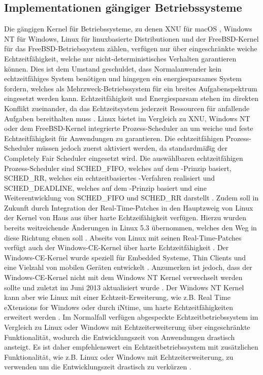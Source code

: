 \subsection{Implementationen gängiger Betriebssysteme} %
Die gängigen Kernel für Betriebssysteme, zu denen XNU für macOS \cite{xnu_2019}, Windows NT für Windows, Linux für linuxbasierte Distributionen und der FreeBSD-Kernel für das FreeBSD-Betriebssystem zählen, verfügen nur über eingeschränkte weiche Echtzeitfähigkeit, welche nur nicht-deterministisches Verhalten garantieren können. Dies ist dem Umstand geschuldet, dass Normalanwender kein echtzeitfähiges System benötigen und hingegen ein energiesparsames System fordern, welches als Mehrzweck-Betriebssystem für ein breites Aufgabenspektrum eingesetzt werden kann. Echtzeitfähigkeit und Energiesparsam stehen im direkten Konflikt zueinander, da das Echtzeitsystem jederzeit Ressourcen für anfallende Aufgaben bereithalten muss \cite{what_is_an_rtos_nodate}. Linux bietet im Vergleich zu XNU, Windows NT oder dem FreeBSD-Kernel integrierte Prozess-Scheduler an um weiche und feste Echtzeitfähigkeit für Anwendungen zu garantieren. Die echtzeitfähigen Prozess-Scheduler müssen jedoch zuerst aktiviert werden, da standardmäßig der Completely Fair Scheduler eingesetzt wird. Die auswählbaren echtzeitfähigen Prozess-Scheduler sind SCHED\_FIFO, welches auf dem -Prinzip basiert, SCHED\_RR, welches ein echtzeitbasiertes -Verfahren realisiert und SCHED\_DEADLINE, welches auf dem -Prinzip basiert und eine Weiterentwicklung von SCHED\_FIFO und SCHED\_RR darstellt \cite{sched_deadline_2020}. Zudem soll in Zukunft durch Integration der Real-Time-Patches in den Hauptzweig von Linux der Kernel von Haus aus über harte Echtzeifähigkeit verfügen. Hierzu wurden bereits weitreichende Änderungen in Linux 5.3 übernommen, welches den Weg in diese Richtung ebnen soll \cite{leemhuis_linux_nodate}. Abseits von Linux mit seinen Real-Time-Patches verfügt auch der Windows-CE-Kernel über harte Echtzeitfähigkeit \cite{chattopadhyay_embedded_2013}. Der Windows-CE-Kernel wurde speziell für Embedded Systeme, Thin Clients und eine Vielzahl von mobilen Geräten entwickelt \cite{hall_windows_ce_2005}. Anzumerken ist jedoch, dass der Windows-CE-Kernel nicht mit dem Windows NT Kernel verwechselt werden sollte und zuletzt im Juni 2013 aktualisiert wurde \cite{microsoft_windows_ce_2019}. Der Windows NT Kernel kann aber wie Linux mit einer Echtzeit-Erweiterung, wie z.B. Real Time eXtensions for Windows oder durch iNtime, um harte Echtzeitfähigkeiten erweitert werden \cite{marchesin_using_2004}. Im Normalfall verfügen abgespeckte Echtzeitbetriebssystem im Vergleich zu Linux oder Windows mit Echtzeiterweiterung über eingeschränkte Funktionalität, wodurch die Entwicklungszeit von Anwendungen drastisch ansteigt. Es ist daher empfehlenswert ein Echtzeitbetriebssystem mit zusätzlichen Funktionalität, wie z.B. Linux oder Windows mit Echtzeiterweiterung, zu verwenden um die Entwicklungszeit drastisch zu verkürzen \cite[433]{echtzeitsystem_2020}.



